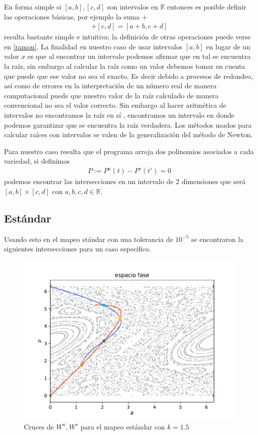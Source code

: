 En forma simple si $[a,b],[c,d]$ son intervalos en $\mathbb{R}$ entonces es posible definir las operaciones básicas, por ejemplo la suma $+$
\begin{eqnarray}
[a,b]+[c,d]=[a+b,c+d]
\end{eqnarray}
resulta bastante simple e intuitiva; la definición de otras operaciones puede verse en \ref{ramon}. La finalidad en nuestro caso de usar intervalos $[a,b]$ en lugar de un valor $x$ es que al encontrar un intervalo podemos afirmar que en tal se encuentra la raíz, sin embargo al calcular la raíz como un valor debemos tomar en cuenta que puede que ese valor no sea el exacto. Es decir debido a procesos de redondeo, así como de errores en la interpretación de un número real de manera computacional puede que nuestro valor de la raíz calculado de manera convencional no sea el valor correcto. Sin embargo al hacer aritmética de intervalos no encontramos la raíz en sí , encontramos un intervalo en donde podemos garantizar que se encuentra la raíz verdadera. Los métodos usados para calcular raíces con intervalos se valen de la generalización del método de Newton.

Para nuestro caso resulta que el programa arroja dos polinomios asociados a cada variedad, si definimos 
\begin{eqnarray}
P:=P^{u}(t)-P^{s}(t')=0
\label{CorteV}
\end{eqnarray}
podemos encontrar las intersecciones en un intervalo de 2 dimensiones que será $[a,b]\times[c,d]$ con $a,b,c,d \in \mathbb{R}$. 


\subsection{Estándar}

Usando esto en el mapeo stándar con una tolerancia de $10^{-5}$ se encontraron la siguientes intersecciones para un caso específico.
\begin{figure}[H]
\centering
\includegraphics[scale=0.4]{cruce_estandar}
\caption{Cruces de $W^{u},W^{s}$ para el mapeo estándar con $k=1.5$ }
\label{cruce_estandar}
\end{figure}







